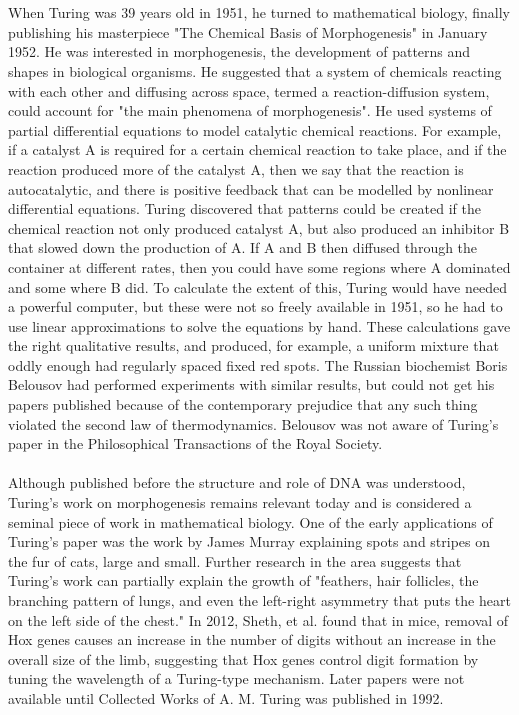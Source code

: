 \documentclass{article}
\begin{document}
\\\\
When Turing was 39 years old in 1951, he turned to mathematical biology, finally publishing his masterpiece "The Chemical Basis of Morphogenesis" in January 1952. He was interested in morphogenesis, the development of patterns and shapes in biological organisms. He suggested that a system of chemicals reacting with each other and diffusing across space, termed a reaction-diffusion system, could account for "the main phenomena of morphogenesis". He used systems of partial differential equations to model catalytic chemical reactions. For example, if a catalyst A is required for a certain chemical reaction to take place, and if the reaction produced more of the catalyst A, then we say that the reaction is autocatalytic, and there is positive feedback that can be modelled by nonlinear differential equations. Turing discovered that patterns could be created if the chemical reaction not only produced catalyst A, but also produced an inhibitor B that slowed down the production of A. If A and B then diffused through the container at different rates, then you could have some regions where A dominated and some where B did. To calculate the extent of this, Turing would have needed a powerful computer, but these were not so freely available in 1951, so he had to use linear approximations to solve the equations by hand. These calculations gave the right qualitative results, and produced, for example, a uniform mixture that oddly enough had regularly spaced fixed red spots. The Russian biochemist Boris Belousov had performed experiments with similar results, but could not get his papers published because of the contemporary prejudice that any such thing violated the second law of thermodynamics. Belousov was not aware of Turing's paper in the Philosophical Transactions of the Royal Society.
\\\\
Although published before the structure and role of DNA was understood, Turing's work on morphogenesis remains relevant today and is considered a seminal piece of work in mathematical biology. One of the early applications of Turing's paper was the work by James Murray explaining spots and stripes on the fur of cats, large and small. Further research in the area suggests that Turing's work can partially explain the growth of "feathers, hair follicles, the branching pattern of lungs, and even the left-right asymmetry that puts the heart on the left side of the chest." In 2012, Sheth, et al. found that in mice, removal of Hox genes causes an increase in the number of digits without an increase in the overall size of the limb, suggesting that Hox genes control digit formation by tuning the wavelength of a Turing-type mechanism. Later papers were not available until Collected Works of A. M. Turing was published in 1992.
\cite{wiki}
\end{document}
